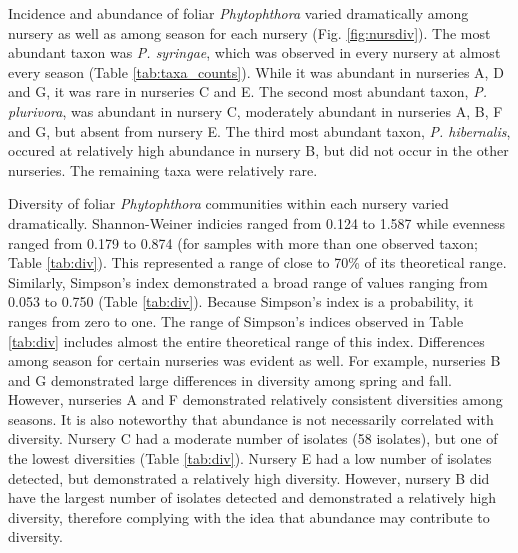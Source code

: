 \documentclass[12pt]{article}
\begin{document}





Incidence and abundance of foliar \emph{Phytophthora} varied dramatically among nursery as well as among season for each nursery (Fig. \ref{fig:nursdiv}).  The most abundant taxon was \emph{P. syringae}, which was observed in every nursery at almost every season (Table \ref{tab:taxa_counts}).  While it was abundant in nurseries A, D and G, it was rare in nurseries C and E.  The second most abundant taxon, \emph{P. plurivora}, was abundant in nursery C, moderately abundant in nurseries A, B, F and G, but absent from nursery E.  The third most abundant taxon, \emph{P. hibernalis}, occured at relatively high abundance in nursery B, but did not occur in the other nurseries.  The remaining taxa were relatively rare.

Diversity of foliar \emph{Phytophthora} communities within each nursery varied dramatically.  Shannon-Weiner indicies ranged from 0.124 to 1.587 while evenness ranged from 0.179 to 0.874 (for samples with more than one observed taxon; Table \ref{tab:div}).  This represented a range of close to 70\% of its theoretical range.  Similarly, Simpson's index demonstrated a broad range of values ranging from 0.053 to 0.750 (Table \ref{tab:div}).  Because Simpson's index is a probability, it ranges from zero to one.  The range of Simpson's indices observed in Table \ref{tab:div} includes almost the entire theoretical range of this index.  Differences among season for certain nurseries was evident as well.  For example, nurseries B and G demonstrated large differences in diversity among spring and fall.  However, nurseries A and F demonstrated relatively consistent diversities among seasons.  It is also noteworthy that abundance is not necessarily correlated with diversity.  Nursery C had a moderate number of isolates (58 isolates), but one of the lowest diversities (Table \ref{tab:div}).  Nursery E had a low number of isolates detected, but demonstrated a relatively high diversity.  However, nursery B did have the largest number of isolates detected and demonstrated a relatively high diversity, therefore complying with the idea that abundance may contribute to diversity.
\end{document}
